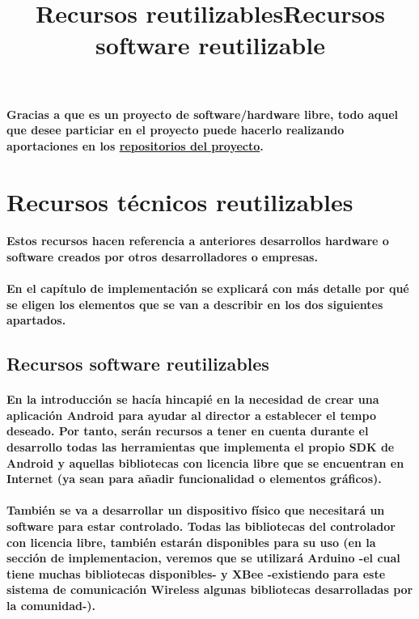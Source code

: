 \paragraph{
Gracias a que es un proyecto de software/hardware libre, todo aquel que
desee particiar en el proyecto puede hacerlo realizando aportaciones en los
\href{https://github.com/iblancasa/ArduBand}{repositorios del proyecto}.
}


\title{Recursos reutilizables}
\section{Recursos técnicos reutilizables}

\paragraph{
Estos recursos hacen referencia a anteriores desarrollos hardware o software creados
por otros desarrolladores o empresas.
}

\paragraph{
En el capítulo de implementación se explicará con más detalle por qué se
eligen los elementos que se van a describir en los dos siguientes apartados.
}


\subsection{Recursos software reutilizables}
\title{Recursos software reutilizable}


\paragraph{
En la introducción se hacía hincapié en la necesidad de crear una aplicación
Android para ayudar al director a establecer el tempo deseado. Por tanto,
serán recursos a tener en cuenta durante el desarrollo todas las herramientas
que implementa el propio SDK de Android y aquellas bibliotecas con licencia
libre que se encuentran en Internet (ya sean para añadir funcionalidad o elementos
gráficos).
}

\paragraph{
También se va a desarrollar un dispositivo físico que necesitará un software para estar
controlado. Todas las bibliotecas del controlador con licencia libre, también estarán
disponibles para su uso (en la sección de implementacion, veremos que se utilizará
Arduino -el cual tiene muchas bibliotecas disponibles- y XBee -existiendo para este
sistema de comunicación Wireless algunas bibliotecas desarrolladas por la comunidad-).
}


